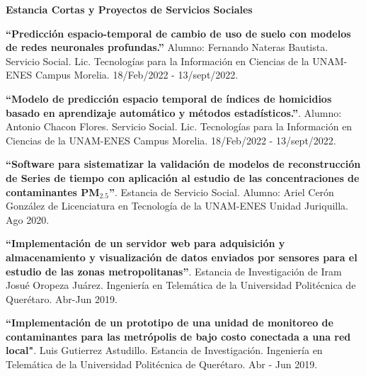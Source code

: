 \documentclass[10pt]{article}
\newenvironment{innerlist}[1][\enskip\textbullet]%
        {\begin{compactitem}[#1]}{\end{compactitem}}
\newcommand{\blankline}{\quad\pagebreak[2]}
\begin{document}
\blankline




\textbf{Estancia Cortas y Proyectos de Servicios Sociales}



\begin{innerlist}

\item \textbf{``Predicción espacio-temporal de cambio de uso de suelo con modelos de redes neuronales profundas.''}  Alumno: Fernando Nateras Bautista. Servicio Social. Lic. Tecnologías para la Información en Ciencias de la UNAM-ENES Campus Morelia. {18/Feb/2022 - 13/sept/2022}.

\item \textbf{``Modelo de predicción espacio temporal de índices de homicidios basado en aprendizaje automático y métodos estadísticos.''}. Alumno: Antonio Chacon Flores. Servicio Social. Lic. Tecnologías para la Información en Ciencias de la UNAM-ENES Campus Morelia. {18/Feb/2022 - 13/sept/2022}.

\item \textbf{``Software para sistematizar la validación de modelos de reconstrucción de Series de tiempo con aplicación al estudio de las concentraciones de contaminantes PM$_{2.5}$''}. Estancia de Servicio Social. Alumno: Ariel Cerón González de Licenciatura en Tecnología de la UNAM-ENES Unidad Juriquilla. Ago 2020.

\item \textbf{``Implementación de un servidor web para adquisición y almacenamiento y visualización de datos enviados por sensores para el estudio de las zonas metropolitanas''}. Estancia de Investigación de Iram Josué Oropeza Juárez. Ingeniería en Telemática de la Universidad Politécnica de Querétaro. Abr-Jun 2019.

\item \textbf{``Implementación de un prototipo de una unidad de monitoreo de contaminantes para las metrópolis de bajo costo conectada a una red local"}. Luis Gutierrez Astudillo. Estancia de Investigación. Ingeniería en Telemática de la Universidad Politécnica de Querétaro. Abr - Jun 2019.


\end{innerlist}
\end{document}
